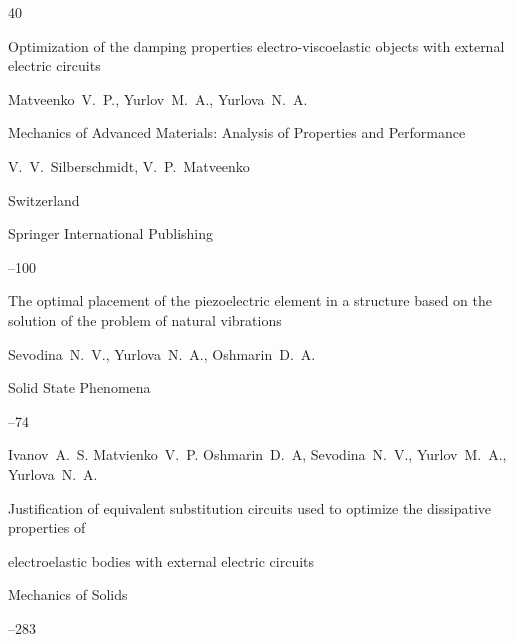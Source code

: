 \begin{thebibliography}{40}

\paper Optimization of the damping properties electro-viscoelastic objects with external electric circuits

\by Matveenko~V.~P., Yurlov~M.~A., Yurlova~N.~A.

\inbook Mechanics of Advanced Materials: Analysis of Properties and Performance

\eds V.~V.~Silberschmidt, V.~P.~Matveenko

\publaddr Switzerland

\publ Springer International Publishing


--100





\paper The optimal placement of the piezoelectric element in a structure based on the solution of the problem of natural vibrations

\by Sevodina~N.~V., Yurlova~N.~A., Oshmarin~D.~A.

\jour Solid State Phenomena



--74





\by Ivanov~A.~S. Matvienko~V.~P. Oshmarin~D.~A, Sevodina~N.~V., Yurlov~M.~A., Yurlova~N.~A.

\paper Justification of equivalent substitution circuits used to optimize the dissipative properties of

electroelastic bodies with external electric circuits

\jour Mechanics of Solids




–283




\end{thebibliography}



\EngDate



%

%

%



\newpage

\Russian

 

\renewcommand{\baselinestretch}{0.9}









